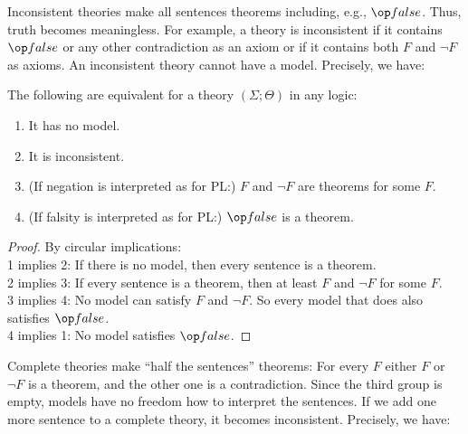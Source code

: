 Inconsistent theories make all sentences theorems including, e.g., $\false$. Thus, truth becomes meaningless. For example, a theory is inconsistent if it contains $\false$ or any other contradiction as an axiom or if it contains both $F$ and $\neg F$ as axioms. An inconsistent theory cannot have a model. Precisely, we have:

\begin{lemma}\label{lem:mod:inconsistent}
The following are equivalent for a theory $(\Sigma;\Theta)$ in any logic:
\begin{enumerate}
	\item It has no model.
	\item It is inconsistent.
	\item (If negation is interpreted as for PL:) $F$ and $\neg F$ are theorems for some $F$.
	\item (If falsity is interpreted as for PL:) $\false$ is a theorem.
\end{enumerate}
\end{lemma}
\begin{proof} By circular implications: \\
1 implies 2: If there is no model, then every sentence is a theorem. \\
2 implies 3: If every sentence is a theorem, then at least $F$ and $\neg F$ for some $F$. \\
3 implies 4: No model can satisfy $F$ and $\neg F$. So every model that does also satisfies $\false$. \\
4 implies 1: No model satisfies $\false$.
\end{proof}

Complete theories make ``half the sentences'' theorems: For every $F$ either $F$ or $\neg F$ is a theorem, and the other one is a contradiction.
Since the third group is empty, models have no freedom how to interpret the sentences.
If we add one more sentence to a complete theory, it becomes inconsistent.
Precisely, we have:

